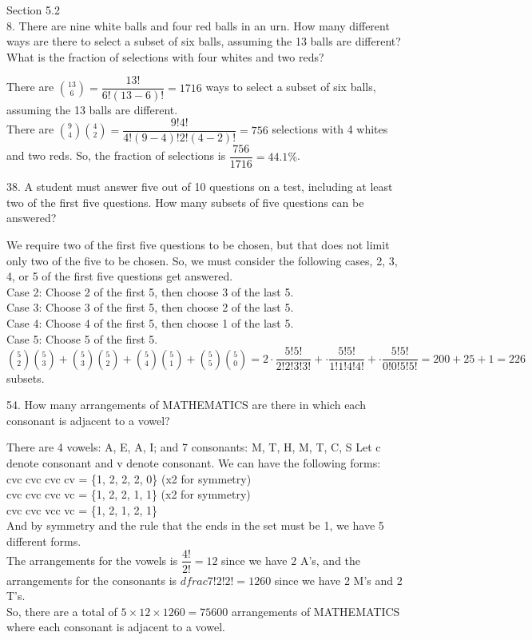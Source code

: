 \documentclass[12pt]{article}
\begin{document}
Section 5.2 \\
8. There are nine white balls and four red balls in an urn. How
many different ways are there to select a subset of six balls, 
assuming the 13 balls are different? What is the fraction of 
selections with four whites and two reds? 
\begin{solution}
    There are $\binom{13}{6}=\dfrac{13!}{6!(13-6)!}=1716$ ways to 
    select a subset of six balls, assuming the 13 balls are different. \\
    There are $\binom{9}{4}\binom{4}{2}=\dfrac{9!4!}{4!(9-4)!2!(4-2)!}
    =756$ selections with 4 whites and two reds. So, the fraction of 
    selections is $\dfrac{756}{1716}=44.1\%$.  
\end{solution}
38. A student must answer five out of 10 questions on a test, 
including at least two of the first five questions. How many 
subsets of five questions can be answered?
\begin{solution}
    We require two of the first five questions to be chosen, but 
    that does not limit only two of the five to be chosen. So, we must 
    consider the following cases, 2, 3, 4, or 5 of the first five 
    questions get answered. \\
    Case 2: Choose 2 of the first 5, then choose 3 of the last 5. \\
    Case 3: Choose 3 of the first 5, then choose 2 of the last 5. \\ 
    Case 4: Choose 4 of the first 5, then choose 1 of the last 5. \\
    Case 5: Choose 5 of the first 5. \\
    $
    \binom{5}{2}\binom{5}{3}
    +\binom{5}{3}\binom{5}{2}
    +\binom{5}{4}\binom{5}{1}
    +\binom{5}{5}\binom{5}{0}
    =2\cdot\dfrac{5!5!}{2!2!3!3!}
    +\cdot\dfrac{5!5!}{1!1!4!4!}
    +\cdot\dfrac{5!5!}{0!0!5!5!}
    =200 + 25 + 1 = 226
    $ subsets. 
\end{solution}
54. How many arrangements of MATHEMATICS are there in which each consonant
is adjacent to a vowel?
\begin{solution}
    There are 4 vowels: A, E, A, I; and 7 consonants: M, T, H, M, T, C, S 
    Let c denote consonant and v denote consonant. 
    We can have the following forms: \\
    cvc cvc cvc cv = \{1, 2, 2, 2, 0\} (x2 for symmetry)\\
    cvc cvc cvc vc = \{1, 2, 2, 1, 1\} (x2 for symmetry)\\
    cvc cvc vcc vc = \{1, 2, 1, 2, 1\}\\
    And by symmetry and the rule that the ends in the 
    set must be 1, we have 5 different forms. \\
    The arrangements for the vowels is $\dfrac{4!}{2!}=12$ 
    since we have 2 A's, and the arrangements for the 
    consonants is $dfrac{7!}{2!2!}=1260$ since we have 2 M's 
    and 2 T's. \\

    So, there are a total of $5\times12\times1260=75600$ 
    arrangements of MATHEMATICS where each consonant is 
    adjacent to a vowel. 
\end{solution}
\end{document}
